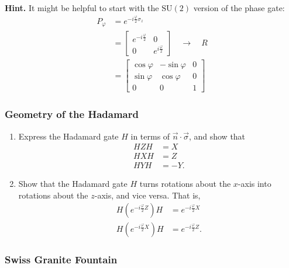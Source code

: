 \documentclass[fleqn]{article}
\begin{document}
\textbf{Hint.} It might be helpful to start with the \(\mathrm{SU}(2)\) version of the phase gate:
\[
  \begin{aligned}
    P_\varphi
    &= e^{-i\frac{\varphi}{2}\sigma_z}
  \\&= \begin{bmatrix}
      e^{-i \frac{\varphi}{2}}& 0
    \\0 & e^{i \frac{\varphi}{2}}
    \end{bmatrix}
    \quad\longrightarrow\quad
    R
  \\&= \begin{bmatrix}
      \cos \varphi & -\sin \varphi & 0
    \\\sin \varphi & \cos \varphi & 0
    \\0 & 0 & 1
    \end{bmatrix}
  \end{aligned}
\]

\hypertarget{geometry-of-the-hadamard}{%
\subsubsection{Geometry of the Hadamard}\label{geometry-of-the-hadamard}}

\begin{enumerate}
\def\labelenumi{\arabic{enumi}.}
\item
  Express the Hadamard gate \(H\) in terms of \(\vec{n}\cdot\vec{\sigma}\), and show that
  \[
    \begin{aligned}
   HZH&=X
    \\HXH&=Z
    \\HYH&=-Y.
    \end{aligned}
  \]
\item
  Show that the Hadamard gate \(H\) turns rotations about the \(x\)-axis into rotations about the \(z\)-axis, and vice versa.
  That is,
  \[
     \begin{aligned}
       H \left(
         e^{-i\frac{\varphi}{2}Z}
       \right) H
       &= e^{-i\frac{\varphi}{2}X}
     \\H \left(
         e^{-i\frac{\varphi}{2}X}
       \right) H
       &= e^{-i\frac{\varphi}{2}Z}.
     \end{aligned}
   \]
\end{enumerate}

\hypertarget{swiss-granite-fountain}{%
\subsubsection{Swiss Granite Fountain}\label{swiss-granite-fountain}}
\end{document}
